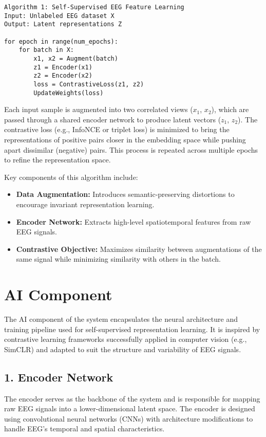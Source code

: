 \begin{verbatim}
Algorithm 1: Self-Supervised EEG Feature Learning
Input: Unlabeled EEG dataset X
Output: Latent representations Z

for epoch in range(num_epochs):
    for batch in X:
        x1, x2 = Augment(batch)
        z1 = Encoder(x1)
        z2 = Encoder(x2)
        loss = ContrastiveLoss(z1, z2)
        UpdateWeights(loss)
\end{verbatim}

\noindent
Each input sample is augmented into two correlated views ($x_1$, $x_2$), which are passed through a shared encoder network to produce latent vectors ($z_1$, $z_2$). The contrastive loss (e.g., InfoNCE or triplet loss) is minimized to bring the representations of positive pairs closer in the embedding space while pushing apart dissimilar (negative) pairs. This process is repeated across multiple epochs to refine the representation space.

Key components of this algorithm include:
\begin{itemize}
    \item \textbf{Data Augmentation:} Introduces semantic-preserving distortions to encourage invariant representation learning.
    \item \textbf{Encoder Network:} Extracts high-level spatiotemporal features from raw EEG signals.
    \item \textbf{Contrastive Objective:} Maximizes similarity between augmentations of the same signal while minimizing similarity with others in the batch.
\end{itemize}


\section{AI Component}
\label{sec:ai-component}

The AI component of the system encapsulates the neural architecture and training pipeline used for self-supervised representation learning. It is inspired by contrastive learning frameworks successfully applied in computer vision (e.g., SimCLR) and adapted to suit the structure and variability of EEG signals.

\subsection*{1. Encoder Network}

The encoder serves as the backbone of the system and is responsible for mapping raw EEG signals into a lower-dimensional latent space. The encoder is designed using convolutional neural networks (CNNs) with architecture modifications to handle EEG's temporal and spatial characteristics.

